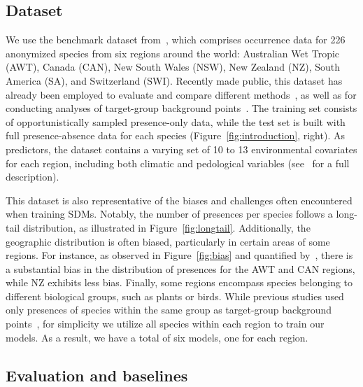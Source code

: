 \documentclass[3p,preprint,12pt]{elsarticle}
\begin{document}
\subsection{Dataset}
\label{sec:dataset}

We use the benchmark dataset from~\cite{elith2020presence}, which comprises occurrence data for 226 anonymized species from six regions around the world: Australian Wet Tropic (AWT), Canada (CAN), New South Wales (NSW), New Zealand (NZ), South America (SA), and Switzerland (SWI). Recently made public, this dataset has already been employed to evaluate and compare different methods~\citep{elith2006novel, valavi2022predictive}, as well as for conducting analyses of target-group background points~\citep{phillips2009sample}. The training set consists of opportunistically sampled presence-only data, while the test set is built with full presence-absence data for each species (Figure~\ref{fig:introduction}, right).
As predictors, the dataset contains a varying set of 10 to 13 environmental covariates for each region, including both climatic and pedological variables (see~\cite{elith2020presence} for a full description).

This dataset is also representative of the biases and challenges often encountered when training SDMs. Notably, the number of presences per species follows a long-tail distribution, as illustrated in Figure~\ref{fig:longtail}. Additionally, the geographic distribution is often biased, particularly in certain areas of some regions. For instance, as observed in Figure~\ref{fig:bias} and quantified by~\cite{phillips2009sample}, there is a substantial bias in the distribution of presences for the AWT and CAN regions, while NZ exhibits less bias. Finally, some regions encompass species belonging to different biological groups, such as plants or birds. While previous studies used only presences of species within the same group as target-group background points~\citep{ponder2001evaluation, phillips2009sample}, for simplicity we utilize all species within each region to train our models. As a result, we have a total of six models, one for each region.

\subsection{Evaluation and baselines}
\label{sec:baselines}
\end{document}
